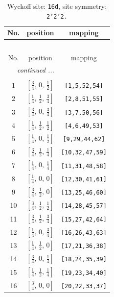 \documentclass[fleqn,8pt]{jsarticle}
\begin{document}
\renewcommand{\arraystretch}{1.2}
\begin{longtable}{ccc}
\caption{Wyckoff site: {\tt 16d}, site symmetry: {\tt 2'2'2.}}
 \\
 \hline \hline
No. & position & mapping \\ \hline \endfirsthead

\multicolumn{2}{l}{\tablename\ \thetable{}} \\
 \hline \hline
No. & position & mapping \\ \hline \endhead

 \hline \hline
\multicolumn{2}{r}{\footnotesize\it continued ...} \\ \endfoot

 \hline \hline
\multicolumn{2}{r}{} \\ \endlastfoot

1 & $\left[ \frac{3}{4},\, 0,\, \frac{1}{2} \right]$ & {\tt [1,5,52,54]} \\ \hline
2 & $\left[ \frac{1}{4},\, \frac{1}{2},\, \frac{3}{4} \right]$ & {\tt [2,8,51,55]} \\ \hline
3 & $\left[ \frac{3}{4},\, 0,\, \frac{3}{4} \right]$ & {\tt [3,7,50,56]} \\ \hline
4 & $\left[ \frac{1}{4},\, \frac{1}{2},\, \frac{1}{2} \right]$ & {\tt [4,6,49,53]} \\ \hline
5 & $\left[ \frac{1}{4},\, 0,\, \frac{1}{2} \right]$ & {\tt [9,29,44,62]} \\ \hline
6 & $\left[ \frac{3}{4},\, \frac{1}{2},\, \frac{1}{4} \right]$ & {\tt [10,32,47,59]} \\ \hline
7 & $\left[ \frac{1}{4},\, 0,\, \frac{1}{4} \right]$ & {\tt [11,31,48,58]} \\ \hline
8 & $\left[ \frac{1}{4},\, 0,\, 0 \right]$ & {\tt [12,30,41,61]} \\ \hline
9 & $\left[ \frac{3}{4},\, \frac{1}{2},\, 0 \right]$ & {\tt [13,25,46,60]} \\ \hline
10 & $\left[ \frac{3}{4},\, \frac{1}{2},\, \frac{1}{2} \right]$ & {\tt [14,28,45,57]} \\ \hline
11 & $\left[ \frac{3}{4},\, \frac{1}{2},\, \frac{3}{4} \right]$ & {\tt [15,27,42,64]} \\ \hline
12 & $\left[ \frac{1}{4},\, 0,\, \frac{3}{4} \right]$ & {\tt [16,26,43,63]} \\ \hline
13 & $\left[ \frac{1}{4},\, \frac{1}{2},\, 0 \right]$ & {\tt [17,21,36,38]} \\ \hline
14 & $\left[ \frac{3}{4},\, 0,\, \frac{1}{4} \right]$ & {\tt [18,24,35,39]} \\ \hline
15 & $\left[ \frac{1}{4},\, \frac{1}{2},\, \frac{1}{4} \right]$ & {\tt [19,23,34,40]} \\ \hline
16 & $\left[ \frac{3}{4},\, 0,\, 0 \right]$ & {\tt [20,22,33,37]} \\
\end{longtable}
\end{document}
